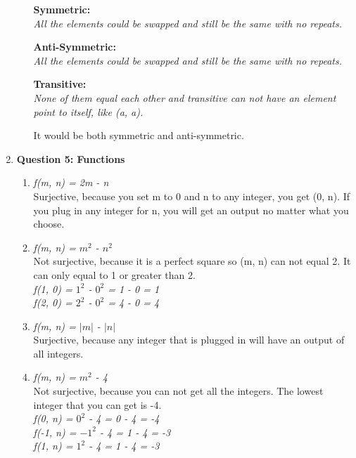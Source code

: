 \documentclass[11pt]{article}
\begin{document}
\begin{enumerate}
\begin{enumerate}[label=(\alph*)]
\textbf {
Symmetric: 
} \\
\textit {
All the elements could be swapped and still be the same with no repeats. \\
}

\textbf {
Anti-Symmetric: 
} \\
\textit {
All the elements could be swapped and still be the same with no repeats. \\
}

\textbf {
Transitive: 
} \\
\textit {
None of them equal each other and transitive can not have an element point to itself, like (a, a). \\
}

It would be both symmetric and anti-symmetric. \\
\end {enumerate}

\item 
\textbf {Question 5: Functions } %
\begin {enumerate} [label = (\alph*)] 
\item %
\textit {
f(m, n) = 2m - n \\
}
Surjective, because you set m to 0 and n to any integer, you get (0, n). If you plug in any integer for n, you will get an output no matter what you choose. \\

\item %
\textit {
f(m, n) = $m^{2}$ - $n^{2}$ \\
}
Not surjective, because it is a perfect square so (m, n) can not equal 2. It can only equal to 1 or greater than 2. \\
\textit {
f(1, 0) = $1^{2}$ - $0^{2}$ = 1 - 0 = 1 \\
f(2, 0) = $2^{2}$ - $0^{2}$ = 4 - 0 = 4 \\
}

\item %
\textit {
f(m, n) = $\left|m\right|$ - $\left|n\right|$ \\
}
Surjective, because any integer that is plugged in will have an output of all integers. \\

\item %
\textit {
f(m, n) = $m^{2}$ - 4 \\
}
Not surjective, because you can not get all the integers. The lowest integer that you can get is -4. \\
\textit {
f(0, n) = $0^{2}$ - 4 = 0 - 4 = -4 \\
f(-1, n) = $-1^{2}$ - 4 = 1 - 4 = -3 \\
f(1, n) = $1^{2}$ - 4 = 1 - 4 = -3 \\
}
\end {enumerate}
\end{enumerate}
\end{document}
